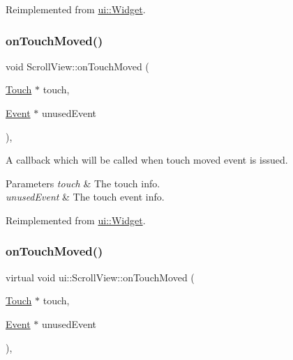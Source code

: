 Reimplemented from \hyperlink{classui_1_1Widget_ac4d1576dfe1f3cf0a509f2d2ca0c5b90}{ui\+::\+Widget}.

\mbox{\label{classui_1_1ScrollView_aabab84777e16b8c5d90cd8d045e45471}} 
\subsubsection{\texorpdfstring{on\+Touch\+Moved()}{onTouchMoved()}\hspace{0.1cm}{\footnotesize\ttfamily [1/2]}}
{\footnotesize\ttfamily void Scroll\+View\+::on\+Touch\+Moved (\begin{DoxyParamCaption}\item[{\hyperlink{classTouch}{Touch} $\ast$}]{touch,  }\item[{\hyperlink{classEvent}{Event} $\ast$}]{unused\+Event }\end{DoxyParamCaption})\hspace{0.3cm}{\ttfamily [override]}, {\ttfamily [virtual]}}

A callback which will be called when touch moved event is issued. 
\begin{DoxyParams}{Parameters}
{\em touch} & The touch info. \\
\hline
{\em unused\+Event} & The touch event info. \\
\hline
\end{DoxyParams}


Reimplemented from \hyperlink{classui_1_1Widget_a16e6247b1c43273eac77623e8f129dd4}{ui\+::\+Widget}.

\mbox{\label{classui_1_1ScrollView_a14d0d7bcb1061ba38fa9b0d2d1715b1c}} 
\subsubsection{\texorpdfstring{on\+Touch\+Moved()}{onTouchMoved()}\hspace{0.1cm}{\footnotesize\ttfamily [2/2]}}
{\footnotesize\ttfamily virtual void ui\+::\+Scroll\+View\+::on\+Touch\+Moved (\begin{DoxyParamCaption}\item[{\hyperlink{classTouch}{Touch} $\ast$}]{touch,  }\item[{\hyperlink{classEvent}{Event} $\ast$}]{unused\+Event }\end{DoxyParamCaption})\hspace{0.3cm}{\ttfamily [override]}, {\ttfamily [virtual]}}

